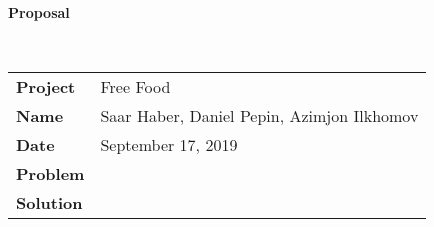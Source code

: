 \documentclass[11pt]{article}
\newcommand{\info}{
  \begin{tabular}{l p{6.5in}}
    \textbf{Project}    & Free Food \\ \hdashline
    \textbf{Name}       & Saar Haber, Daniel Pepin, Azimjon Ilkhomov \\ \hdashline
    \textbf{Date}       & September 17, 2019 \\ \hdashline
    \textbf{Problem}    & \\ \hdashline
    \textbf{Solution}   &  \\
  \end{tabular}
}
\begin{document}
\begin{flushright}\textbf{\large Proposal}\end{flushright}
\ttfamily
~ \\
\info
\end{document}
